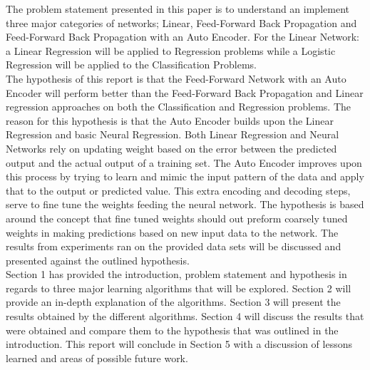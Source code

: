 \documentclass[twoside,11pt]{article}
\begin{document}
\hspace*{5mm} The problem statement presented in this paper is to understand an implement three major categories of networks; Linear, Feed-Forward Back Propagation and  Feed-Forward Back Propagation with an Auto Encoder. For the Linear Network: a Linear Regression will be applied to Regression problems while a Logistic Regression will be applied to the Classification Problems.\\
\hspace*{5mm} The hypothesis of this report is that the  Feed-Forward Network with an Auto Encoder will perform better than the Feed-Forward Back Propagation and Linear regression approaches on both the Classification and Regression problems. The reason for this hypothesis is that the Auto Encoder builds upon the Linear Regression and basic Neural Regression. Both Linear Regression and Neural Networks rely on updating weight based on the error between the predicted output and the actual output of a training set. The Auto Encoder improves upon this process by trying to learn and mimic the input pattern of the data and apply that to the output or predicted value. This extra encoding and decoding steps, serve to fine tune the weights feeding the neural network. The hypothesis is based around the concept that fine tuned weights should out preform coarsely tuned weights in making predictions based on new input data to the network. The results from experiments ran on the provided data sets will be discussed and presented against the outlined hypothesis.\\
\hspace*{5mm} Section 1 has provided the introduction, problem statement and hypothesis in regards to three major learning algorithms that will be explored. Section 2 will provide an in-depth explanation of the algorithms. Section 3 will present the results obtained by the different algorithms. Section 4 will discuss the results that were obtained and compare them to the hypothesis that was outlined in the introduction. This report will conclude in Section 5 with a discussion of lessons learned and areas of possible future work.\\
\end{document}
